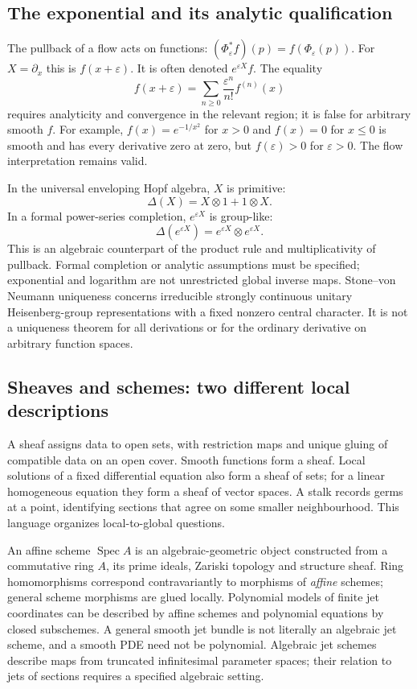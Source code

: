 \documentclass[11pt,a4paper]{article}
\numberwithin{equation}{section}
\theoremstyle{definition}
\theoremstyle{plain}
\theoremstyle{remark}
\begin{document}
\subsection{The exponential and its analytic qualification}
The pullback of a flow acts on functions: $(\Phi_\varepsilon^*f)(p)=f(\Phi_\varepsilon(p))$. For $X=\partial_x$ this is $f(x+\varepsilon)$. It is often denoted $e^{\varepsilon X}f$. The equality
\[
f(x+\varepsilon)=\sum_{n\ge0}\frac{\varepsilon^n}{n!}f^{(n)}(x)
\]
requires analyticity and convergence in the relevant region; it is false for arbitrary smooth $f$. For example, $f(x)=e^{-1/x^2}$ for $x>0$ and $f(x)=0$ for $x\le0$ is smooth and has every derivative zero at zero, but $f(\varepsilon)>0$ for $\varepsilon>0$. The flow interpretation remains valid.

In the universal enveloping Hopf algebra, $X$ is primitive:
\[
\Delta(X)=X\otimes1+1\otimes X.
\]
In a formal power-series completion, $e^{\varepsilon X}$ is group-like:
\[
\Delta(e^{\varepsilon X})=e^{\varepsilon X}\otimes e^{\varepsilon X}.
\]
This is an algebraic counterpart of the product rule and multiplicativity of pullback. Formal completion or analytic assumptions must be specified; exponential and logarithm are not unrestricted global inverse maps. Stone--von Neumann uniqueness concerns irreducible strongly continuous unitary Heisenberg-group representations with a fixed nonzero central character. It is not a uniqueness theorem for all derivations or for the ordinary derivative on arbitrary function spaces.

\subsection{Sheaves and schemes: two different local descriptions}
A sheaf assigns data to open sets, with restriction maps and unique gluing of compatible data on an open cover. Smooth functions form a sheaf. Local solutions of a fixed differential equation also form a sheaf of sets; for a linear homogeneous equation they form a sheaf of vector spaces. A stalk records germs at a point, identifying sections that agree on some smaller neighbourhood. This language organizes local-to-global questions.

An affine scheme $\operatorname{Spec}A$ is an algebraic-geometric object constructed from a commutative ring $A$, its prime ideals, Zariski topology and structure sheaf. Ring homomorphisms correspond contravariantly to morphisms of \emph{affine} schemes; general scheme morphisms are glued locally. Polynomial models of finite jet coordinates can be described by affine schemes and polynomial equations by closed subschemes. A general smooth jet bundle is not literally an algebraic jet scheme, and a smooth PDE need not be polynomial. Algebraic jet schemes describe maps from truncated infinitesimal parameter spaces; their relation to jets of sections requires a specified algebraic setting.
\end{document}
